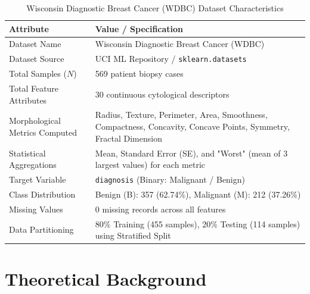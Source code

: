 \documentclass[12pt,a4paper]{article}
\begin{document}
\begin{table}[H]
\centering
\caption{Wisconsin Diagnostic Breast Cancer (WDBC) Dataset Characteristics}
\label{tab:dataset_summary}
\begin{tabular}{|p{6cm}|p{8cm}|}
\hline
\textbf{Attribute} & \textbf{Value / Specification} \\ \hline
Dataset Name & Wisconsin Diagnostic Breast Cancer (WDBC) \\ \hline
Dataset Source & UCI ML Repository / \texttt{sklearn.datasets} \\ \hline
Total Samples ($N$) & 569 patient biopsy cases \\ \hline
Total Feature Attributes & 30 continuous cytological descriptors \\ \hline
Morphological Metrics Computed & Radius, Texture, Perimeter, Area, Smoothness, Compactness, Concavity, Concave Points, Symmetry, Fractal Dimension \\ \hline
Statistical Aggregations & Mean, Standard Error (SE), and "Worst" (mean of 3 largest values) for each metric \\ \hline
Target Variable & \texttt{diagnosis} (Binary: Malignant / Benign) \\ \hline
Class Distribution & Benign (B): 357 (62.74\%), Malignant (M): 212 (37.26\%) \\ \hline
Missing Values & 0 missing records across all features \\ \hline
Data Partitioning & 80\% Training (455 samples), 20\% Testing (114 samples) using Stratified Split \\ \hline
\end{tabular}
\end{table}

\section{Theoretical Background}
\end{document}

